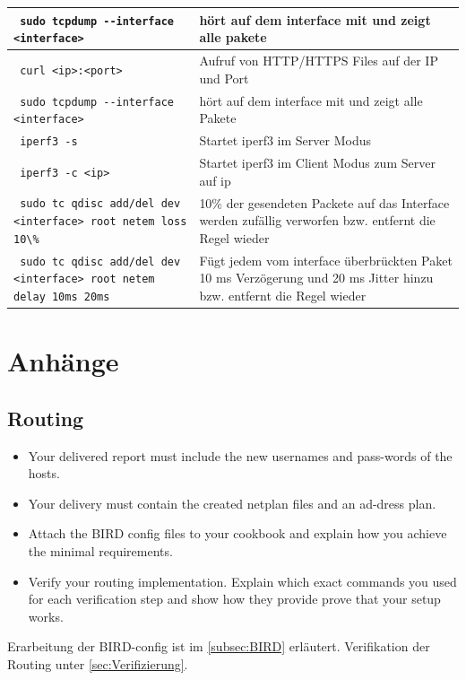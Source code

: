\documentclass[11pt,titlepage]{article}
\newenvironment{shadedquotation}
 {\begin{shaded*}
  \quoting[leftmargin=0pt, vskip=0pt]
 }
 {\endquoting
 \end{shaded*}
}
\begin{document}
\begin{tabular}{ |p{4cm}|p{10cm}|}
  \hline
  \lstinline! sudo tcpdump --interface <interface> ! & hört auf dem interface mit und zeigt alle pakete\\
  \hline
  \lstinline! curl <ip>:<port> ! & Aufruf von HTTP/HTTPS Files auf der IP und Port\\
  \hline
  \lstinline! sudo tcpdump --interface <interface> ! & hört auf dem interface mit und zeigt alle Pakete\\
  \hline
  \lstinline! iperf3 -s ! & Startet iperf3 im Server Modus\\
  \hline
  \lstinline! iperf3 -c <ip> ! & Startet iperf3 im Client Modus zum Server auf ip\\
  \hline
  \lstinline! sudo tc qdisc add/del dev <interface> root netem loss 10\% ! & 10\% der gesendeten Packete auf das Interface werden zufällig verworfen bzw. entfernt die Regel wieder\\
  \hline
  \lstinline! sudo tc qdisc add/del dev <interface> root netem delay 10ms 20ms ! & Fügt jedem vom interface überbrückten Paket 10 ms Verzögerung und 20 ms Jitter hinzu bzw. entfernt die Regel wieder\\
  \hline
\end{tabular}
\newpage

\section{Anhänge}
\label{sec:Anhänge}

\subsection{Routing}
\label{subsec:Routing}
\begin{shadedquotation}
  \begin{itemize}
    \item Your delivered report must include the new usernames and pass-words of the hosts.
    \item Your delivery must contain the created netplan files and an ad-dress plan.
    \item Attach the BIRD config files to your cookbook and explain how you achieve the minimal requirements.
    \item Verify your routing implementation. Explain which exact commands you used for each verification step and show how they provide prove that your setup works.
  \end{itemize}
\end{shadedquotation}
Erarbeitung der BIRD-config ist im \ref{subsec:BIRD} erläutert.
Verifikation der Routing unter \ref{sec:Verifizierung}.
\end{document}
